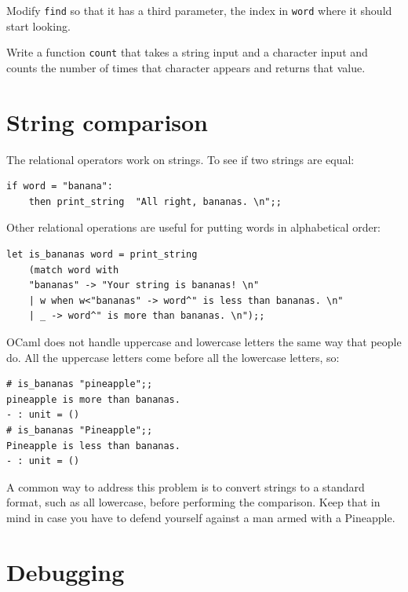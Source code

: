 \documentclass[10pt]{book}
\begin{document}
\begin{ex}
Modify {\tt find} so that it has a
third parameter, the index in {\tt word} where it should start
looking.
\end{ex}

\begin{ex}
Write a function {\tt count} that takes a string input and a 
character input and counts the number of times that character
appears and returns that value.
\end{ex}

\section{String comparison}


The relational operators work on strings.  To see if two strings are equal:

\beforeverb
\begin{verbatim}
if word = "banana":
    then print_string  "All right, bananas. \n";;
\end{verbatim}
\afterverb
%
Other relational operations are useful for putting words in alphabetical
order:

\beforeverb
\begin{verbatim}
let is_bananas word = print_string
	(match word with 
	"bananas" -> "Your string is bananas! \n"
	| w when w<"bananas" -> word^" is less than bananas. \n"
	| _ -> word^" is more than bananas. \n");;
\end{verbatim}
\afterverb

OCaml does not handle uppercase and lowercase letters the same way
that people do.  All the uppercase letters come before all the
lowercase letters, so:

\beforeverb
\begin{verbatim}
# is_bananas "pineapple";;
pineapple is more than bananas.
- : unit = ()
# is_bananas "Pineapple";;
Pineapple is less than bananas.
- : unit = ()
\end{verbatim}
\afterverb
%
A common way to address this problem is to convert strings to a
standard format, such as all lowercase, before performing the
comparison.  Keep that in mind in case you have to defend yourself
against a man armed with a Pineapple.

\section{Debugging}
\end{document}
